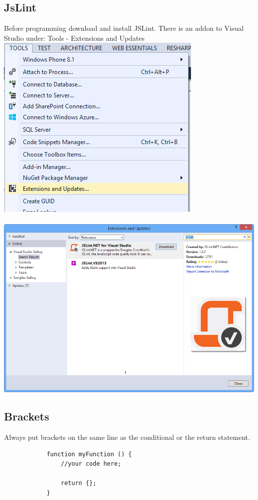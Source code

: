 \documentclass {amsart}
\begin{document}
	\subsection{JsLint}
		Before programming download and install JSLint.  There is an addon to Visual Studio under: Tools - Extensions and Updates
		\\
		\includegraphics[scale=.75]{ToolsExtensionsAndAddons.png}
		\\
		\\
		\includegraphics[scale=.45]{JsLintAddOn.png}
	\subsection {Brackets}

		Always put brackets on the same line as the conditional or the return statement.

		\begin{lstlisting}
			function myFunction () {
				//your code here;

				return {};
			}
		\end{lstlisting}	
\end{document}
